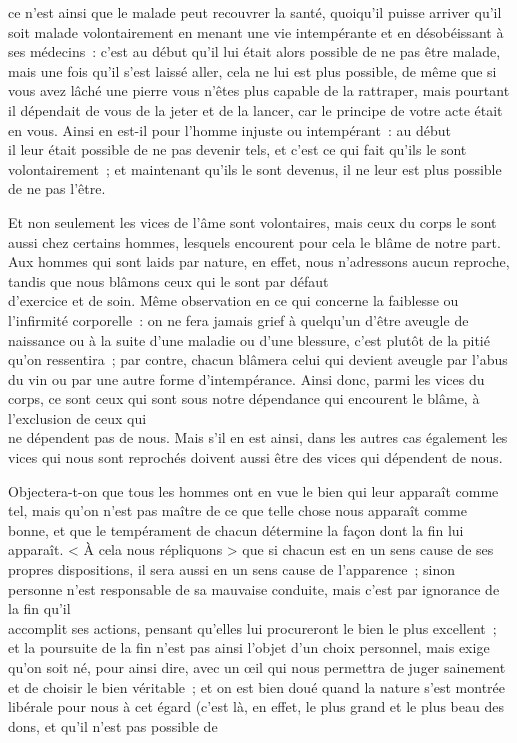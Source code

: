 \documentclass[french,twoside]{book} %
\begin{document}
ce n’est ainsi que le malade peut recouvrer la santé, quoiqu’il puisse arriver qu’il soit malade volontairement en menant une vie intempérante et en désobéissant à ses médecins : c’est au début qu’il lui était alors possible de ne pas être malade, mais une fois qu’il s’est laissé aller, cela ne lui est plus possible, de même que si vous avez lâché une pierre vous n’êtes plus capable de la rattraper, mais pourtant il dépendait de vous de la jeter et de la lancer, car le principe de votre acte était en vous. Ainsi en est-il pour l’homme injuste ou intempérant : au début \\
il leur était possible de ne pas devenir tels, et c’est ce qui fait qu’ils le sont volontairement ; et maintenant qu’ils le sont devenus, il ne leur est plus possible de ne pas l’être.\par
Et non seulement les vices de l’âme sont volontaires, mais ceux du corps le sont aussi chez certains hommes, lesquels encourent pour cela le blâme de notre part. Aux hommes qui sont laids par nature, en effet, nous n’adressons aucun reproche, tandis que nous blâmons ceux qui le sont par défaut \\
d’exercice et de soin. Même observation en ce qui concerne la faiblesse ou l’infirmité corporelle : on ne fera jamais grief à quelqu’un d’être aveugle de naissance ou à la suite d’une maladie ou d’une blessure, c’est plutôt de la pitié qu’on ressentira ; par contre, chacun blâmera celui qui devient aveugle par l’abus du vin ou par une autre forme d’intempérance. Ainsi donc, parmi les vices du corps, ce sont ceux qui sont sous notre dépendance qui encourent le blâme, à l’exclusion de ceux qui \\
ne dépendent pas de nous. Mais s’il en est ainsi, dans les autres cas également les vices qui nous sont reprochés doivent aussi être des vices qui dépendent de nous.\par
Objectera-t-on que tous les hommes ont en vue le bien qui leur apparaît comme tel, mais qu’on n’est pas maître de ce que telle chose nous apparaît comme bonne, et que le tempérament  de chacun détermine la façon dont la fin lui apparaît. < À cela nous répliquons > que si chacun est en un sens cause de ses propres dispositions, il sera aussi en un sens cause de l’apparence ; sinon personne n’est responsable de sa mauvaise conduite, mais c’est par ignorance de la fin qu’il \\
accomplit ses actions, pensant qu’elles lui procureront le bien le plus excellent ; et la poursuite de la fin n’est pas ainsi l’objet d’un choix personnel, mais exige qu’on soit né, pour ainsi dire, avec un œil qui nous permettra de juger sainement et de choisir le bien véritable ; et on est bien doué quand la nature s’est montrée libérale pour nous à cet égard (c’est là, en effet, le plus grand et le plus beau des dons, et qu’il n’est pas possible de \\
\end{document}
